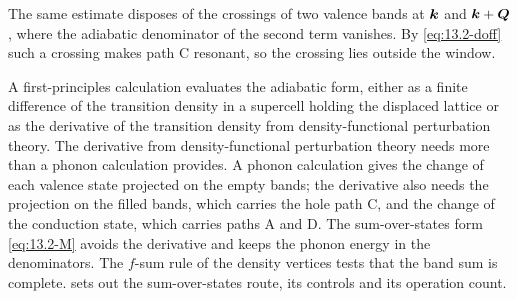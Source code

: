 The same estimate disposes of the crossings of two valence bands at $\bm{k}$ and $\bm{k}+\bm{Q}$, where the adiabatic denominator of the second term vanishes. By \cref{eq:13.2-doff} such a crossing makes path C resonant, so the crossing lies outside the window.

A first-principles calculation evaluates the adiabatic form, either as a finite difference of the transition density in a supercell holding the displaced lattice or as the derivative of the transition density from density-functional perturbation theory. The derivative from density-functional perturbation theory needs more than a phonon calculation provides. A phonon calculation gives the change of each valence state projected on the empty bands; the derivative also needs the projection on the filled bands, which carries the hole path C, and the change of the conduction state, which carries paths A and D. The sum-over-states form \cref{eq:13.2-M} avoids the derivative and keeps the phonon energy in the denominators. The $f$-sum rule of the density vertices tests that the band sum is complete.  sets out the sum-over-states route, its controls and its operation count.

